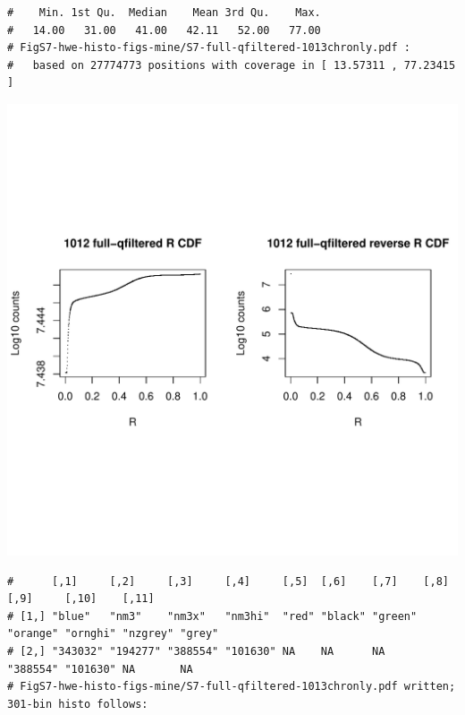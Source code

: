 \documentclass{article}\usepackage[]{graphicx}\usepackage[]{color}
\makeatletter
\def\maxwidth{ %
  \ifdim\Gin@nat@width>\linewidth
    \linewidth
  \else
    \Gin@nat@width
  \fi
}
\newenvironment{kframe}{%
 \def\at@end@of@kframe{}%
 \ifinner\ifhmode%
  \def\at@end@of@kframe{\end{minipage}}%
  \begin{minipage}{\columnwidth}%
 \fi\fi%
 \def\FrameCommand##1{\hskip\@totalleftmargin \hskip-\fboxsep
 \colorbox{shadecolor}{##1}\hskip-\fboxsep
     \hskip-\linewidth \hskip-\@totalleftmargin \hskip\columnwidth}%
 \MakeFramed {\advance\hsize-\width
   \@totalleftmargin\z@ \linewidth\hsize
   \@setminipage}}%
 {\par\unskip\endMakeFramed%
 \at@end@of@kframe}
\newenvironment{knitrout}{}{} %
\makeatother
\begin{document}
\begin{knitrout}
\begin{kframe}
\begin{verbatim}
#    Min. 1st Qu.  Median    Mean 3rd Qu.    Max. 
#   14.00   31.00   41.00   42.11   52.00   77.00 
# FigS7-hwe-histo-figs-mine/S7-full-qfiltered-1013chronly.pdf :
#   based on 27774773 positions with coverage in [ 13.57311 , 77.23415 ]
\end{verbatim}
\end{kframe}
\includegraphics[width=\maxwidth]{FigS7-hwe-histo-figs-knitr/unnamed-chunk-10-32} 
\begin{kframe}\begin{verbatim}
#      [,1]     [,2]     [,3]     [,4]     [,5]  [,6]    [,7]    [,8]     [,9]     [,10]    [,11] 
# [1,] "blue"   "nm3"    "nm3x"   "nm3hi"  "red" "black" "green" "orange" "ornghi" "nzgrey" "grey"
# [2,] "343032" "194277" "388554" "101630" NA    NA      NA      "388554" "101630" NA       NA    
# FigS7-hwe-histo-figs-mine/S7-full-qfiltered-1013chronly.pdf written; 301-bin histo follows:
\end{verbatim}
\end{kframe}

\end{knitrout}
\end{document}
